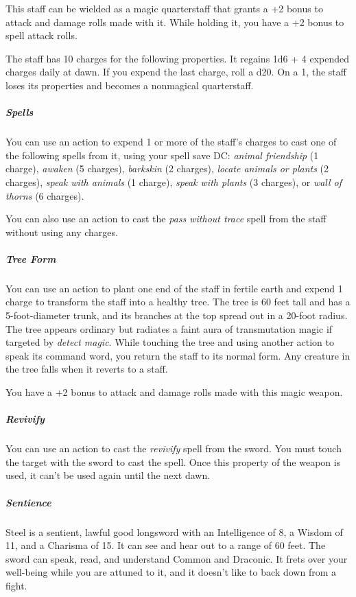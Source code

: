 \documentclass[10pt,a4paper,twoside,bg=print,twocolumn,openany,nodeprecatedcode]{dndbook}
\begin{document}
This staff can be wielded as a magic quarterstaff that grants a +2 bonus to attack and damage rolls made with it. While holding it, you have a +2 bonus to spell attack rolls.

The staff has 10 charges for the following properties. It regains 1d6 + 4 expended charges daily at dawn. If you expend the last charge, roll a d20. On a 1, the staff loses its properties and becomes a nonmagical quarterstaff.

\subparagraph{Spells}
You can use an action to expend 1 or more of the staff's charges to cast one of the following spells from it, using your spell save DC: \textit{animal friendship} (1 charge), \textit{awaken} (5 charges), \textit{barkskin} (2 charges), \textit{locate animals or plants} (2 charges), \textit{speak with animals} (1 charge), \textit{speak with plants} (3 charges), or \textit{wall of thorns} (6 charges).

You can also use an action to cast the \textit{pass without trace} spell from the staff without using any charges.

\subparagraph{Tree Form}
You can use an action to plant one end of the staff in fertile earth and expend 1 charge to transform the staff into a healthy tree. The tree is 60 feet tall and has a 5-foot-diameter trunk, and its branches at the top spread out in a 20-foot radius. The tree appears ordinary but radiates a faint aura of transmutation magic if targeted by \textit{detect magic}. While touching the tree and using another action to speak its command word, you return the staff to its normal form. Any creature in the tree falls when it reverts to a staff.

You have a +2 bonus to attack and damage rolls made with this magic weapon.

\subparagraph{Revivify}
You can use an action to cast the \textit{revivify} spell from the sword. You must touch the target with the sword to cast the spell. Once this property of the weapon is used, it can't be used again until the next dawn.

\subparagraph{Sentience}
Steel is a sentient, lawful good longsword with an Intelligence of 8, a Wisdom of 11, and a Charisma of 15. It can see and hear out to a range of 60 feet. The sword can speak, read, and understand Common and Draconic. It frets over your well-being while you are attuned to it, and it doesn't like to back down from a fight.
\end{document}
